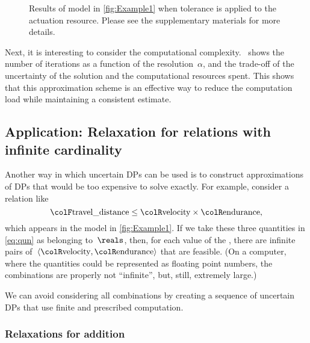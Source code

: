 \begin{figure}[h]

	\caption{Results of model in \cref{fig:Example1} when tolerance is applied
		to the actuation  resource.
		Please see the supplementary
		materials for more details.
	}
\end{figure}

Next, it is interesting to consider the computational complexity.
~shows the number of iterations as
a function of the resolution~$\alpha$, and the trade-off of the
uncertainty of the solution and the computational resources spent.
This shows that this approximation scheme is an effective way to reduce
the computation load while maintaining a consistent estimate.

\subsection{Application: Relaxation for relations with infinite cardinality\label{sec:Application-relax}}

Another way in which uncertain DPs can be used is to construct approximations
of DPs that would be too expensive to solve exactly.
For example,
consider a relation like
\begin{equation}
	{\colF\text{travel\_distance}}
	\leq{\colR\text{velocity}}\times{\colR\text{endurance}},\label{eq:qun}
\end{equation}
which appears in the model in \cref{fig:Example1}.
If we take
these three quantities in \cref{eq:qun} as belonging to~$\reals$,
then, for each value of the , there are infinite
pairs of~$\left\langle {\colR\text{velocity}},{\colR\text{endurance}}\right\rangle $
that are feasible.
(On a computer, where the quantities could be represented
as floating point numbers, the combinations are properly not ``infinite'',
but, still, extremely large.)

We can avoid considering all combinations by creating a sequence of
uncertain DPs that use finite and prescribed computation.

\subsubsection{Relaxations for addition}

